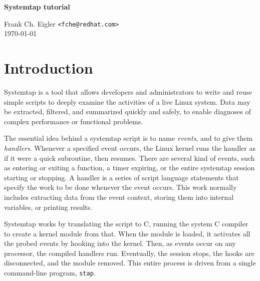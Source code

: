 \documentclass{article}
\renewcommand{\nomenclature}[2]{}
\begin{document}
\begin{center}
\LARGE {\bf Systemtap tutorial}
\end{center}

\hfill \begin{minipage}{2.5in}
Frank Ch. Eigler {\tt \small <fche@redhat.com>} \\
\hfill \today
\end{minipage}

\tableofcontents

\section{Introduction}

Systemtap is a tool that allows developers and administrators to write
and reuse simple scripts to deeply examine the activities of a live
Linux system.  Data may be extracted, filtered, and summarized quickly
and safely, to enable diagnoses of complex performance or functional
problems.

\nomenclature{script}{A simple programming language understood by systemtap.}

The essential idea behind a systemtap script is to name {\em events},
and to give them {\em handlers}.  Whenever a specified event occurs,
the Linux kernel runs the handler as if it were a quick subroutine,
then resumes.  There are several kind of events, such as entering or
exiting a function, a timer expiring, or the entire systemtap session
starting or stopping.  A handler is a series of script language
statements that specify the work to be done whenever the event occurs.
This work normally includes extracting data from the event context,
storing them into internal variables, or printing results.

\nomenclature{event}{An identifiable instant in the operating system's
execution state, such as entry to a function, or expiry of a timer.}
\nomenclature{session}{A complete run of a systemtap script program.}
\nomenclature{handler}{A series of statements, written in script, which
is to be performed whenever an event occurs.}
\nomenclature{\tt .stp}{The standard file name extension for systemtap
scripts.}

Systemtap works by translating the script to C, running the system C
compiler to create a kernel module from that.  When the module is
loaded, it activates all the probed events by hooking into the kernel.
Then, as events occur on any processor, the compiled handlers run.
Eventually, the session stops, the hooks are disconnected, and the
module removed.  This entire process is driven from a single
command-line program, \verb+stap+.
\end{document}
